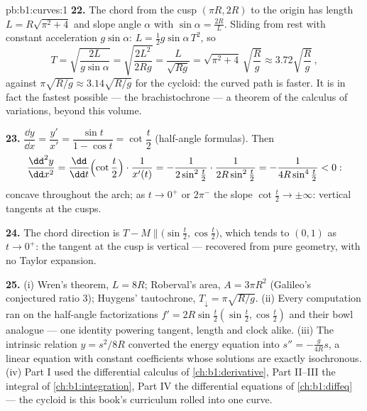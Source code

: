 \begin{solution}{pb:b1:curves:1}
\textbf{22.} The chord from the cusp $(\pi R, 2R)$ to the origin
has length $L = R\sqrt{\pi^2 + 4}$ and slope angle $\alpha$ with
$\sin\alpha = \frac{2R}{L}$. Sliding from rest with constant
acceleration $g\sin\alpha$: $L = \frac12 g\sin\alpha\,T^2$, so
\[
T = \sqrt{\frac{2L}{g\sin\alpha}} = \sqrt{\frac{2L^2}{2Rg}}
= \frac{L}{\sqrt{Rg}} = \sqrt{\pi^2 + 4}\,\sqrt{\frac Rg}
\approx 3.72\sqrt{\frac Rg}\,,
\]
against $\pi\sqrt{R/g} \approx 3.14\sqrt{R/g}$ for the cycloid:
the curved path is faster. It is in fact the fastest possible
--- the brachistochrone --- a theorem of the calculus of
variations, beyond this volume.

\textbf{23.} $\dfrac{\dd y}{\dd x} = \dfrac{y'}{x'} =
\dfrac{\sin t}{1 - \cos t} = \cot\dfrac t2$ (half-angle
formulas). Then
\[
\frac{\dd^2y}{\dd x^2}
= \frac{\dd}{\dd t}\Bigl(\cot\frac t2\Bigr)\cdot\frac{1}{x'(t)}
= -\frac{1}{2\sin^2\frac t2}\cdot\frac{1}{2R\sin^2\frac t2}
= -\frac{1}{4R\sin^4\frac t2} < 0 :
\]
concave throughout the arch; as $t \to 0^+$ or $2\pi^-$ the
slope $\cot\frac t2 \to \pm\infty$: vertical tangents at the
cusps.

\textbf{24.} The chord direction is $T - M \parallel
\bigl(\sin\frac t2, \cos\frac t2\bigr)$, which tends to $(0, 1)$
as $t \to 0^{+}$: the tangent at the cusp is vertical ---
recovered from pure geometry, with no Taylor expansion.

\textbf{25.} (i) Wren's theorem, $L = 8R$; Roberval's area, $A =
3\pi R^2$ (Galileo's conjectured ratio $3$); Huygens'
tautochrone, $T_\downarrow = \pi\sqrt{R/g}$. (ii) Every
computation ran on the half-angle factorizations $f' =
2R\sin\frac t2(\sin\frac t2, \cos\frac t2)$ and their bowl
analogue --- one identity powering tangent, length and clock
alike. (iii) The intrinsic relation $y = s^2/8R$ converted the
energy equation into $s'' = -\frac{g}{4R}s$, a linear equation
with constant coefficients whose solutions are exactly
isochronous. (iv) Part I used the differential calculus of
\cref{ch:b1:derivative}, Part II--III the integral of
\cref{ch:b1:integration}, Part IV the differential equations of
\cref{ch:b1:diffeq} --- the cycloid is this book's curriculum
rolled into one curve.
\end{solution}
